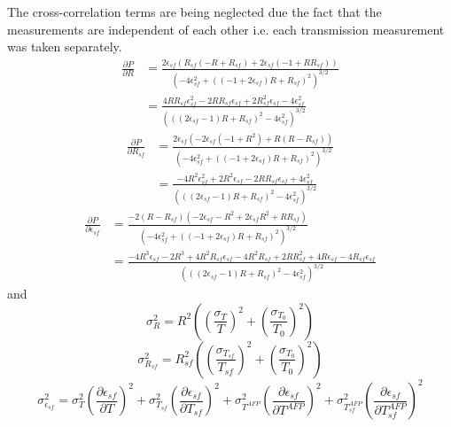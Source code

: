The cross-correlation terms are being neglected due the fact that the measurements are independent of each other i.e. each transmission measurement was taken separately.
\begin{align}
    \frac{\partial P}{\partial R} 
    &= \frac{2 \epsilon_{sf} \left(R_{sf} \left(-R + R_{sf}\right) + 2 \epsilon_{sf} \left(-1 + R R_{sf}\right)\right)}{\left(-4 \epsilon_{sf}^2 + \left(\left(-1 + 2 \epsilon_{sf}\right) R + R_{sf}\right)^2\right)^{3/2}} \nonumber \\
    &=\frac{4RR_{sf}\epsilon_{sf}^2-2RR_{sf}\epsilon_{sf}+2R_{sf}^2\epsilon_{sf}-4\epsilon_{sf}^2}{\left( \left(\left(2 \epsilon_{sf} - 1 \right) R + R_{sf}\right)^2 - 4 \epsilon_{sf}^2 \right)^{3/2}}
\end{align}
\begin{align}
    \frac{\partial P}{\partial R_{sf}} 
    & = \frac{2 \epsilon_{sf} \left(-2 \epsilon_{sf} \left(-1 + R^2\right) + R \left(R - R_{sf}\right)\right)}{\left(-4 \epsilon_{sf}^2 + \left(\left(-1 + 2 \epsilon_{sf}\right) R + R_{sf}\right)^2\right)^{3/2}} \nonumber \\
    & = \frac{-4R^2\epsilon_{sf}^2+2R^2\epsilon_{sf}-2RR_{sf}\epsilon_{sf}+4\epsilon_{sf}^2}{\left(\left(\left(2 \epsilon_{sf} - 1 \right) R + R_{sf}\right)^2 - 4 \epsilon_{sf}^2\right)^{3/2}}
\end{align}
\begin{align}
    \frac{\partial P}{\partial \epsilon_{sf}} 
    & = \frac{-2 \left(R - R_{sf}\right) \left(-2 \epsilon_{sf} - R^2 + 2 \epsilon_{sf} R^2 + R R_{sf}\right)}{\left(-4 \epsilon_{sf}^2 + \left(\left(-1 + 2 \epsilon_{sf}\right) R + R_{sf}\right)^2\right)^{3/2}} \nonumber \\
    & = \frac{-4R^3\epsilon_{sf}-2R^3+4R^2R_{sf}\epsilon_{sf}-4R^2R_{sf}+2RR_{sf}^2+4R\epsilon_{sf}-4R_{sf}\epsilon_{sf}}{\left(\left(\left(2 \epsilon_{sf} - 1 \right) R + R_{sf}\right)^2 - 4 \epsilon_{sf}^2\right)^{3/2}}
\end{align}
and
\begin{equation}
    \sigma_R^2 = R^2\left(\left(\frac{\sigma_T}{T}\right)^2+\left(\frac{\sigma_{T_0}}{T_0}\right)^2\right)
\end{equation}
\begin{equation}
    \sigma_{R_{sf}}^2 = R_{sf}^2\left(\left(\frac{\sigma_{T_{sf}}}{T_{sf}}\right)^2+\left(\frac{\sigma_{T_0}}{T_0}\right)^2\right)
\end{equation}
\begin{equation}
    \sigma_{\epsilon_{sf}}^2 = \sigma_T^2 \left(\frac{\partial \epsilon_{sf}}{\partial T}\right)^{2}+ \sigma_{T_{sf}}^2 \left(\frac{\partial \epsilon_{sf}}{\partial T_{sf}}\right)^{2} + \sigma_{T^{AFP}}^2 \left(\frac{\partial \epsilon_{sf}}{\partial T^{AFP}}\right)^{2} + \sigma_{T_{sf}^{AFP}}^2 \left(\frac{\partial \epsilon_{sf}}{\partial T_{sf}^{AFP}}\right)^{2}
\end{equation}

